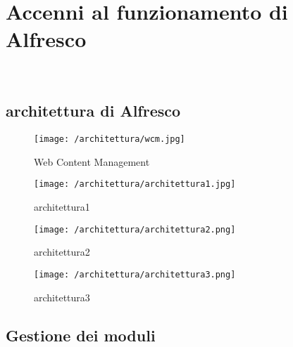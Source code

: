 \chapter{Accenni al funzionamento di Alfresco}
\label{cap:architettura}

\\

\section{architettura di Alfresco}
\begin{figure}[!ht]
\centering
\texttt{[image: /architettura/wcm.jpg]}
\caption{Web Content Management\label{overflow}}
\end{figure}
\begin{figure}[!ht]
\centering
\texttt{[image: /architettura/architettura1.jpg]}
\caption{architettura1\label{overflow}}
\end{figure}
\begin{figure}[!ht]
\centering
\texttt{[image: /architettura/architettura2.png]}
\caption{architettura2\label{overflow}}
\end{figure}
\begin{figure}[!ht]
\centering
\texttt{[image: /architettura/architettura3.png]}
\caption{architettura3}
\end{figure}
\section{Gestione dei moduli\label{overflow}}

